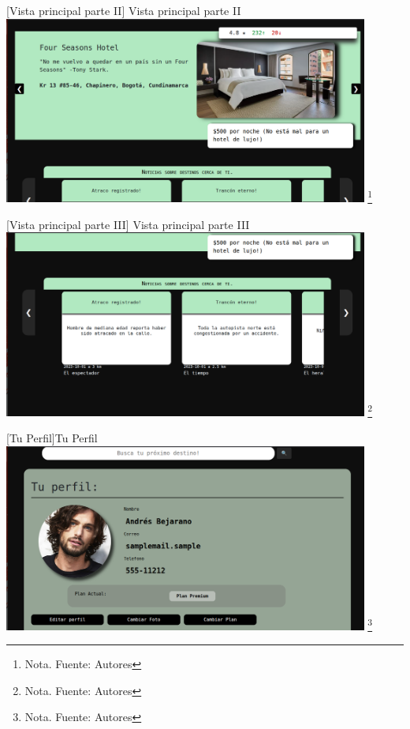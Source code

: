     \vspace{2mm}
    \begin{minipage}{0.9\textwidth}
    \centering
    [{Vista principal parte II}]{ Vista principal parte II}
    \label{prot2}
    \includegraphics[width=0.9\textwidth]{Content/Images/VistaGeneral2.png}
    \footnote{Nota. \textup{Fuente: Autores}}
    \end{minipage}

    \vspace{2mm}
    \begin{minipage}{0.9\textwidth}
    \centering
    [{Vista principal parte III}]{ Vista principal parte III}
    \label{prot3}
    \includegraphics[width=0.9\textwidth]{Content/Images/VistaGeneral3.png}
    \footnote{Nota. \textup{Fuente: Autores}}
    \end{minipage}

    \vspace{2mm}
    \begin{minipage}{0.9\textwidth}
    \centering
    [{Tu Perfil}]{Tu Perfil}
    \label{prot4}
    \includegraphics[width=0.9\textwidth]{Content/Images/TuPerfil.png}
    \footnote{Nota. \textup{Fuente: Autores}}
    \end{minipage}

